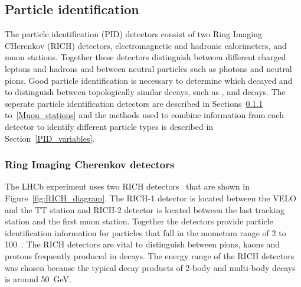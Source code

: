 \subsection{Particle identification}
\label{PID}
The particle identification (PID) detectors consist of two Ring Imaging CHerenkov (RICH) detectors, electromagnetic and hadronic calorimeters, and muon stations. Together these detectors distinguish between different charged leptons and hadrons and between neutral particles such as photons and neutral pions. Good particle identification is necessary to determine which \bhadron decayed and to distinguish between topologically similar decays, such as \bdkpi, \bskk and \bmumu decays. %
The seperate particle identification detectors are described in Sections~\ref{RICH} to~\ref{Muon_stations} and the methods used to combine information from each detector to identify different particle types is described in Section~\ref{PID_variables}. 


\subsubsection{Ring Imaging Cherenkov detectors}
\label{RICH}

The LHCb experiment uses two RICH detectors~\cite{Amato:494263,Adinolfi:2012qfa} that are shown in Figure~\ref{fig:RICH_diagram}.
The RICH-1 detector is located between the VELO and the TT station and RICH-2 detector is located between the last tracking station and the first muon station.
 Together the detectors provide particle identification information for particles that fall in the mometum range of 2 to 100~\gevc.
The RICH detectors are vital to distinguish between pions, kaons and protons frequently produced in \bhadron decays. %
The energy range of the RICH detectors was chosen because the typical decay products of 2-body and multi-body \bhadron decays is around 50~GeV. 



